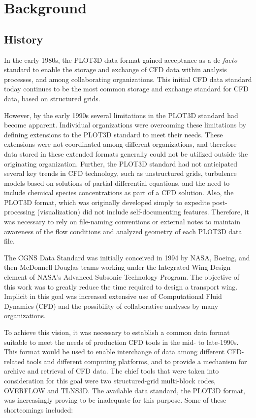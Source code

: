\section{Background}
\label{s:background}
\thispagestyle{plain}

\subsection{History}
\label{s:history}

In the early 1980s, the PLOT3D data format gained acceptance as a de
\textit{facto} standard to enable the storage and exchange of CFD data
within analysis processes, and among collaborating organizations.
This initial CFD data standard today continues to be the most common
storage and exchange standard for CFD data, based on structured grids.

However, by the early 1990s several limitations in the PLOT3D standard
had become apparent.
Individual organizations were overcoming these limitations by defining
extensions to the PLOT3D standard to meet their needs.
These extensions were not coordinated among different organizations, and
therefore data stored in these extended formats generally could not be
utilized outside the originating organization.
Further, the PLOT3D standard had not anticipated several key trends in
CFD technology, such as unstructured grids, turbulence models based on
solutions of partial differential equations, and the need to include
chemical species concentrations as part of a CFD solution.
Also, the PLOT3D format, which was originally developed simply
to expedite post-processing (visualization) did not include
self-documenting features.
Therefore, it was necessary to rely on file-naming conventions or
external notes to maintain awareness of the flow conditions and analyzed
geometry of each PLOT3D data file.

The CGNS Data Standard was initially conceived in 1994 by
NASA,
Boeing, and then-McDonnell Douglas
teams working under the Integrated Wing Design element of NASA's
Advanced Subsonic Technology Program.
The objective of this work was to greatly reduce the time required to
design a transport wing.
Implicit in this goal was increased extensive use of Computational
Fluid Dynamics (CFD) and the possibility of collaborative analyses by
many organizations.

To achieve this vision, it was necessary to establish a common data
format suitable to meet the needs of production CFD tools in the mid- to
late-1990s.
This format would be used to enable interchange of data among different
CFD-related tools and different computing platforms, and to provide a
mechanism for archive and retrieval of CFD data.
The chief tools that were taken into consideration for this goal were
two structured-grid multi-block codes, OVERFLOW and TLNS3D.
The available data standard, the PLOT3D format, was increasingly proving
to be inadequate for this purpose.
Some of these shortcomings included:

